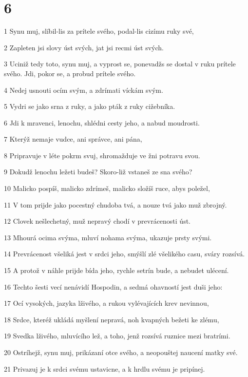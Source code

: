 \chapter{6}

\par 1 Synu muj, slíbil-lis za prítele svého, podal-lis cizímu ruky své,
\par 2 Zapleten jsi slovy úst svých, jat jsi recmi úst svých.
\par 3 Uciniž tedy toto, synu muj, a vyprost se, ponevadžs se dostal v ruku prítele svého. Jdi, pokor se, a probud prítele svého.
\par 4 Nedej usnouti ocím svým, a zdrímati víckám svým.
\par 5 Vydri se jako srna z ruky, a jako pták z ruky cižebníka.
\par 6 Jdi k mravenci, lenochu, shlédni cesty jeho, a nabud moudrosti.
\par 7 Kterýž nemaje vudce, ani správce, ani pána,
\par 8 Pripravuje v léte pokrm svuj, shromažduje ve žni potravu svou.
\par 9 Dokudž lenochu ležeti budeš? Skoro-liž vstaneš ze sna svého?
\par 10 Malicko pospíš, malicko zdrímeš, malicko složíš ruce, abys poležel,
\par 11 V tom prijde jako pocestný chudoba tvá, a nouze tvá jako muž zbrojný.
\par 12 Clovek nešlechetný, muž nepravý chodí v prevrácenosti úst.
\par 13 Mhourá ocima svýma, mluví nohama svýma, ukazuje prsty svými.
\par 14 Prevrácenost všeliká jest v srdci jeho, smýšlí zlé všelikého casu, sváry rozsívá.
\par 15 A protož v náhle prijde bída jeho, rychle setrín bude, a nebudet ulécení.
\par 16 Techto šesti vecí nenávidí Hospodin, a sedmá ohavností jest duši jeho:
\par 17 Ocí vysokých, jazyka lživého, a rukou vylévajících krev nevinnou,
\par 18 Srdce, kteréž ukládá myšlení nepravá, noh kvapných bežeti ke zlému,
\par 19 Svedka lživého, mluvícího lež, a toho, jenž rozsívá ruznice mezi bratrími.
\par 20 Ostríhejž, synu muj, prikázaní otce svého, a neopouštej naucení matky své.
\par 21 Privazuj je k srdci svému ustavicne, a k hrdlu svému je pripínej.
